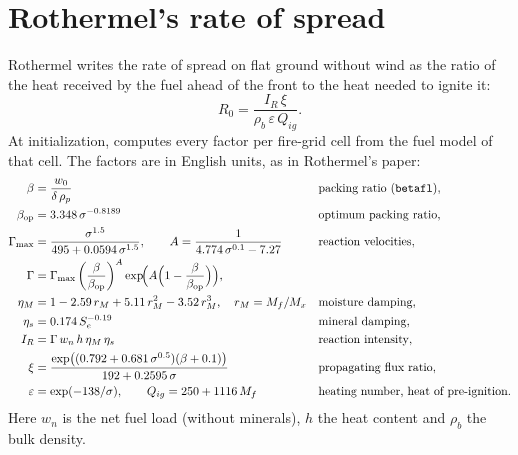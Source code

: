 \section{Rothermel's rate of spread}

Rothermel writes the rate of spread on flat ground without wind as the ratio of the heat received by the fuel ahead
of the front to the heat needed to ignite it:
\begin{equation}
  R_0 = \frac{I_R\,\xi}{\rho_b\,\varepsilon\,Q_{ig}} .
\end{equation}
At initialization,  computes every factor per fire-grid cell from
the fuel model of that cell. The factors are in English units, as in Rothermel's paper:
\begin{align*}
  \beta &= \frac{w_0}{\delta\,\rho_p} && \text{packing ratio (\code{betafl})}, \\
  \beta_{\mathrm{op}} &= 3.348\,\sigma^{-0.8189} && \text{optimum packing ratio}, \\
  \Gamma_{\max} &= \frac{\sigma^{1.5}}{495 + 0.0594\,\sigma^{1.5}}, \qquad
  A = \frac{1}{4.774\,\sigma^{0.1} - 7.27} && \text{reaction velocities}, \\
  \Gamma &= \Gamma_{\max}\left(\frac{\beta}{\beta_{\mathrm{op}}}\right)^{A}
            \exp\!\Bigl(A\Bigl(1 - \frac{\beta}{\beta_{\mathrm{op}}}\Bigr)\Bigr), \\
  \eta_M &= 1 - 2.59\,r_M + 5.11\,r_M^2 - 3.52\,r_M^3, \quad r_M = M_f/M_x && \text{moisture damping}, \\
  \eta_s &= 0.174\,S_e^{-0.19} && \text{mineral damping}, \\
  I_R &= \Gamma\,w_n\,h\,\eta_M\,\eta_s && \text{reaction intensity}, \\
  \xi &= \frac{\exp\bigl((0.792 + 0.681\,\sigma^{0.5})(\beta + 0.1)\bigr)}{192 + 0.2595\,\sigma}
       && \text{propagating flux ratio}, \\
  \varepsilon &= \exp(-138/\sigma), \qquad Q_{ig} = 250 + 1116\,M_f && \text{heating number, heat of pre-ignition}.
\end{align*}
Here $w_n$ is the net fuel load (without minerals), $h$ the heat content and $\rho_b$ the bulk density.

